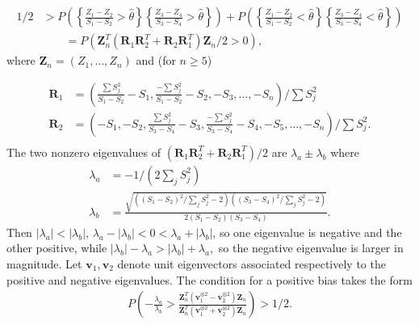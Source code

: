 \documentclass[12pt]{article}
\renewcommand{\P}{P}
\newcommand{\z}{Z}
\newcommand{\y}{Y}
\newcommand{\s}{S}
\newcommand{\x}{X}
\newcommand{\zvec}{\vec{Z}_n}
\renewcommand{\vec}[1]{\textbf{#1}}
\newcommand{\Svec}{\vec{R}}
\newcommand{\eval}{\lambda}
\newcommand{\evec}{\vec{v}}
\newcommand{\thetahat}{\hat{\theta}}
\newcommand{\zs}[2]{\frac{\z_{#1}-\z_{#2}}{\s_{#1}-\s_{#2}}}
\begin{document}
      \begin{align}
        1/2 &> \P\left(\left\{\zs{1}{2}>\thetahat\right\}\left\{\zs{3}{4}>\thetahat\right\}\right) + \P\left(\left\{\zs{1}{2}<\thetahat\right\}\left\{\zs{3}{4}<\thetahat\right\}\right)\\
            &\hspace{2em}= \P(\zvec^T(\Svec_1\Svec_2^T+\Svec_2\Svec_1^T)\zvec/2>0),
      \end{align}
      where $\zvec=(\z_1,\ldots,\z_n)$ and (for $n\ge 5$)

      \begin{align}
        \Svec_1&=\left(\frac{\sum\s_j^2}{\s_1-\s_2}-\s_1, \frac{-\sum\s_j^2}{\s_1-\s_2}-\s_2,-\s_3,\ldots,-\s_n\right)/ \sum\s_j^2  \\
        \Svec_2&=\left(-\s_1,-\s_2,\frac{\sum \s_j^2}{\s_3-\s_4}-\s_3, \frac{-\sum \s_j^2}{\s_3-\s_4}-\s_4,-\s_5,\ldots,-\s_n\right)/ \sum \s_j^2.\\
      \end{align}
      The two nonzero eigenvalues of $(\Svec_1\Svec_2^T+\Svec_2\Svec_1^T)/2$ are $\eval_a\pm\eval_b$ where
      \begin{align}
        \eval_a&=-1/(2\sum_j\s_j^2)\\
        \eval_b&=\frac{\sqrt{((\s_1-\s_2)^2/\sum_j\s_j^2-2)((\s_3-\s_4)^2/\sum_j\s_j^2-2)}}{2(\s_1-\s_2)(\s_3-\s_4)}.
      \end{align}
      Then $|\eval_a|<|\eval_b|$,
      $\eval_a-|\eval_b|<0<\eval_a+|\eval_b|$, so one eigenvalue is
      negative and the other positive, while
      $|\eval_b| - \eval_a> |\eval_b|+ \eval_a,$ so the negative
      eigenvalue is larger in magnitude. Let $\evec_1,\evec_2$ denote
      unit eigenvectors associated respectively to the positive and
      negative eigenvalues. The condition for a positive bias takes
      the form
      \begin{align}
        \P\left( -\frac{\eval_a}{\eval_b} > \frac{\zvec^T(\evec_1^{\otimes 2}-\evec_2^{\otimes 2})\zvec}{\zvec^T(\evec_1^{\otimes 2}+\evec_2^{\otimes 2})\zvec} \right) > 1/2.\label{eqn:iff_cond}
      \end{align}
\end{document}
